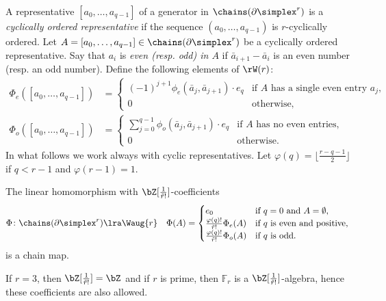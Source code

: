 A representative $[a_0,\dots,a_{q-1}]$ of a generator in $\chains(\partial \simplex^{r})$ is a \emph{cyclically ordered representative} if the sequence $(a_0,\dots,a_{q-1})$ is $r$-cyclically ordered. Let $A=[a_0,\dots,a_{q-1}]\in \chains(\partial \simplex^{r})$ be a cyclically ordered representative. Say that $a_i$ is \emph{even \emph{(resp. \emph{odd})} in $A$} if $\bar{a}_{i+1}-\bar{a}_i$ is an even number (resp. an odd number). 
Define the following elements of $\rW(r)$:
\begin{align*}
	\Phi_e([a_0,\dots,a_{q-1}]) &= \begin{cases}
		(-1)^{j+1}\phi_e(\bar{a}_j,\bar{a}_{j+1})\cdot e_q & \text{if $A$ has a single even entry $a_j$,} \\
		0 & \text{otherwise,}
	\end{cases}
	\\
	\Phi_o([a_0,\dots,a_{q-1}]) &= \begin{cases}
		\sum_{j=0}^{q-1} \phi_o(\bar{a}_j,\bar{a}_{j+1})\cdot e_q & \text{if $A$ has no even entries,} \\
		0 & \text{otherwise.}
	\end{cases}
\end{align*} 
In what follows we work always with cyclic representatives. Let $\varphi(q) = \lfloor\frac{r-q-1}{2}\rfloor$ if $q<r-1$ and $\varphi(r-1) =1$.

\begin{proposition}\label{prop:chains_to_minimal} The linear homomorphism with $\bZ[\frac{1}{\tilde{r}!}]$-coefficients
	\begin{align*}
		\Phi \colon \chains(\partial \simplex^{r})& \lra \Waug{r}
		&
		\Phi(A) = \begin{cases}
			e_0 & \text{if $q=0$ and $A = \emptyset$,}\\
			\frac{\varphi(q)!}{\tilde{r}!}\Phi_e(A) & \text{if $q$ is even and positive,} \\
			\frac{\varphi(q)!}{\tilde{r}!}\Phi_o(A) & \text{if $q$ is odd.}
		\end{cases}
	\end{align*}
	is a chain map.
\end{proposition}

\begin{remark}
	If $r=3$, then $\bZ[\frac{1}{\tilde{r}!}] = \bZ$ and if $r$ is prime, then $\mathbb{F}_r$ is a $\bZ[\frac{1}{\tilde{r}!}]$-algebra, hence these coefficients are also allowed.
\end{remark}

